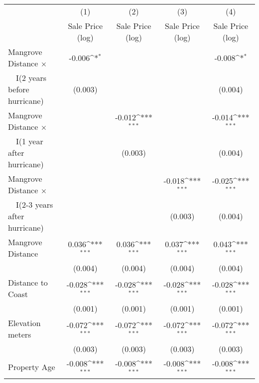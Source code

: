 {
\def\sym#1{\ifmmode^{#1}\else\(^{#1}\)\fi}
\begin{tabular}{l*{4}{c}}
\hline\hline
                    &\multicolumn{1}{c}{(1)}&\multicolumn{1}{c}{(2)}&\multicolumn{1}{c}{(3)}&\multicolumn{1}{c}{(4)}\\
                    &\multicolumn{1}{c}{Sale Price (log)}&\multicolumn{1}{c}{Sale Price (log)}&\multicolumn{1}{c}{Sale Price (log)}&\multicolumn{1}{c}{Sale Price (log)}\\
\hline
Mangrove Distance $\times$       &      -0.006\sym{*}  &                     &                     &      -0.008\sym{*}  \\
\ \ I(2 years before hurricane)
                    &     (0.003)         &                     &                     &     (0.004)         \\
[1em]
Mangrove Distance $\times$         &                     &      -0.012\sym{***}&                     &      -0.014\sym{***}\\
\ \ I(1 year after hurricane)
                    &                     &     (0.003)         &                     &     (0.004)         \\
[1em]
Mangrove Distance $\times$         &                     &                     &      -0.018\sym{***}&      -0.025\sym{***}\\
\ \ I(2-3 years after hurricane)
                    &                     &                     &     (0.003)         &     (0.004)         \\
[1em]
Mangrove Distance   &       0.036\sym{***}&       0.036\sym{***}&       0.037\sym{***}&       0.043\sym{***}\\
                    &     (0.004)         &     (0.004)         &     (0.004)         &     (0.004)         \\
[1em]
Distance to Coast &      -0.028\sym{***}&      -0.028\sym{***}&      -0.028\sym{***}&      -0.028\sym{***}\\
                    &     (0.001)         &     (0.001)         &     (0.001)         &     (0.001)         \\
[1em]
Elevation meters   &      -0.072\sym{***}&      -0.072\sym{***}&      -0.072\sym{***}&      -0.072\sym{***}\\
                    &     (0.003)         &     (0.003)         &     (0.003)         &     (0.003)         \\
[1em]
Property Age            &      -0.008\sym{***}&      -0.008\sym{***}&      -0.008\sym{***}&      -0.008\sym{***}\\

\end{tabular}}
